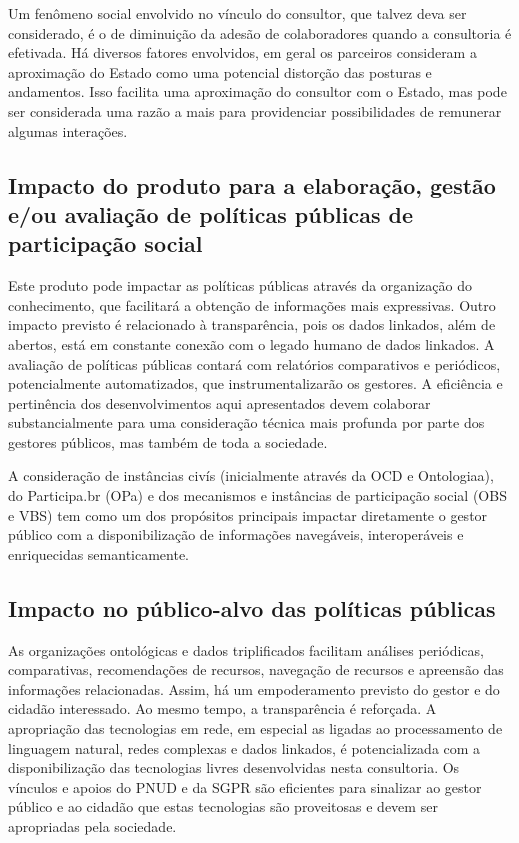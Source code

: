 \documentclass[12pt]{article}
\begin{document}
Um fenômeno social envolvido no vínculo do consultor, que talvez deva ser considerado, é o de diminuição da adesão de colaboradores quando a consultoria é efetivada. Há diversos fatores envolvidos, em geral os parceiros consideram a aproximação do Estado como uma potencial distorção das posturas e andamentos. Isso facilita uma aproximação do consultor com o Estado, mas pode ser considerada uma razão a mais para providenciar possibilidades de remunerar algumas interações.

\subsection{Impacto do produto para a elaboração, gestão e/ou avaliação de políticas públicas de participação social}
Este produto pode impactar as políticas públicas através da organização do conhecimento, que facilitará a obtenção de informações mais expressivas.  Outro impacto previsto é relacionado à transparência, pois os dados linkados, além de abertos, está em constante conexão com o legado humano de dados linkados. A avaliação de políticas públicas contará com relatórios comparativos e periódicos, potencialmente automatizados, que instrumentalizarão os gestores. A eficiência e pertinência dos desenvolvimentos aqui apresentados devem colaborar substancialmente para uma consideração técnica mais profunda por parte dos gestores públicos, mas também de toda a sociedade.

A consideração de instâncias civís (inicialmente através da OCD e Ontologiaa), do Participa.br (OPa) e dos mecanismos e instâncias de participação social (OBS e VBS) tem como um dos propósitos principais impactar diretamente o gestor público com a disponibilização de informações navegáveis, interoperáveis e enriquecidas semanticamente.

\subsection{Impacto no público-alvo das políticas públicas}
As organizações ontológicas e dados triplificados facilitam análises periódicas, comparativas, recomendações de recursos, navegação de recursos e apreensão das informações relacionadas. Assim, há um empoderamento previsto do gestor e do cidadão interessado. Ao mesmo tempo, a transparência é reforçada. A apropriação das tecnologias em rede, em especial as ligadas ao processamento de linguagem natural, redes complexas e dados linkados, é potencializada com a disponibilização das tecnologias livres desenvolvidas nesta consultoria. Os vínculos e apoios do PNUD e da SGPR são eficientes para sinalizar ao gestor público e ao cidadão que estas tecnologias são proveitosas e devem ser apropriadas pela sociedade.
\end{document}
